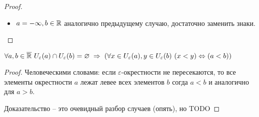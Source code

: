 \begin{proof}
\begin{itemize}
        \item $a = -\infty, b \in \mathbb{R}$ аналогично предыдущему случаю, достаточно заменить знаки.
    \end{itemize}
\end{proof}

\begin{lemma}
    \label{URelationWhenNotIntersecting}
    $\forall a, b \in \RR\ U_\varepsilon(a) \cap U_\varepsilon(b) = \varnothing \thus (\forall x \in U_\varepsilon(a), y \in U_\varepsilon(b)\ (x < y) \Leftrightarrow (a < b))$
\end{lemma}
\begin{proof}
    Человеческими словами: если $\varepsilon$-окрестности не пересекаются, то все элементы окрестности $a$ лежат левее всех элементов $b$ согда $a < b$ и аналогично для $a > b$.

    Доказательство -- это очевидный разбор случаев (опять), но TODO
\end{proof}